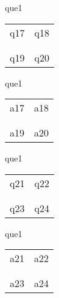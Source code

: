 \documentclass[13.5pt, varwidth=true]{beamer}
\begin{document}
\begin{frame}[shrink=19,fragile]
	\begin{beamercolorbox}[rounded=true, left, shadow=true,wd=14.8cm]{que1}
		\begin{tabular}{p{7cm} | p{7cm}}
			\parbox{7cm}{q17 } & \parbox{7cm}{q18 } \\\\ 
			\hline
			\\\parbox{7cm}{q19 } & \parbox{7cm}{q20 } \\
		\end{tabular}
	\end{beamercolorbox}
\end{frame}
\begin{frame}[shrink=19,fragile]
	\begin{beamercolorbox}[rounded=true, left, shadow=true,wd=14.8cm]{que1}
		\begin{tabular}{p{7cm} | p{7cm}}
			\textcolor{ared}{a17 }  & \textcolor{ared}{a18 } \\\\ 
			\hline
			\\ \textcolor{ared}{a19 }  & \textcolor{ared}{a20 } \\
		\end{tabular}
	\end{beamercolorbox}
\end{frame}

\begin{frame}[shrink=19,fragile]
	\begin{beamercolorbox}[rounded=true, left, shadow=true,wd=14.8cm]{que1}
		\begin{tabular}{p{7cm} | p{7cm}}
			\parbox{7cm}{q21 } & \parbox{7cm}{q22 } \\\\ 
			\hline
			\\ \parbox{7cm}{q23 } & \parbox{7cm}{q24 } \\
		\end{tabular}
	\end{beamercolorbox}
\end{frame}
\begin{frame}[shrink=19,fragile]
	\begin{beamercolorbox}[rounded=true, left, shadow=true,wd=14.8cm]{que1}
		\begin{tabular}{p{7cm} | p{7cm}}
			\textcolor{ared}{a21 }  & \textcolor{ared}{a22 } \\\\ 
			\hline
			\\ \textcolor{ared}{a23 }  & \textcolor{ared}{a24 } \\
		\end{tabular}
	\end{beamercolorbox}
\end{frame}
\end{document}

